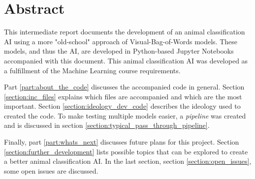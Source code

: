 \chapter*{Abstract}

This intermediate report documents the development of an animal classification AI using a more "old-school" approach of Visual-Bag-of-Words models.
These models, and thus the AI, are developed in Python-based Jupyter Notebooks accompanied with this document.
This animal classification AI was developed as a fulfillment of the Machine Learning course requirements.

Part \ref{part:about_the_code} discusses the accompanied code in general. Section \ref{section:inc_files} explains which files are accompanied and which are the most important. 
Section \ref{section:ideology_dev_code} describes the ideology used to created the code. 
To make testing multiple models easier, a \emph{pipeline} was created and is discussed in section \ref{section:typical_pass_through_pipeline}.

Finally, part \ref{part:whats_next} discusses future plans for this project. Section \ref{section:further_development} lists possible topics that can be explored to create a better animal classification AI. In the last section, section \ref{section:open_issues}, some open issues are discussed.
